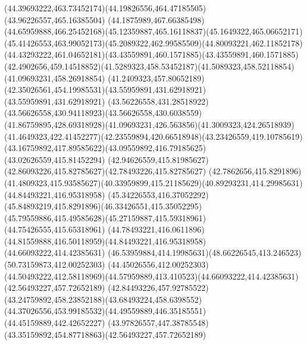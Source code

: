 {{	\curveto(44.39693222,463.73452174)(44.19826556,464.47185505)(43.96226557,465.16385504)
	\lineto(44.1875989,467.66385498)
	\curveto(44.65959888,466.25452168)(45.12359887,465.16118837)(45.1649322,465.06652171)
	\curveto(45.41426553,463.99052173)(45.2089322,462.99585509)(44.80093221,462.11852178)
	\curveto(44.43293222,461.04652181)(43.43559891,460.1571885)(43.43559891,460.1571885)
	\curveto(42.4902656,459.14518852)(41.5289323,458.53452187)(41.5089323,458.52118854)
	\lineto(41.09693231,458.26918854)
	\lineto(41.2409323,457.80652189)
	\curveto(42.35026561,454.19985531)(43.55959891,431.62918921)(43.55959891,431.62918921)
	\curveto(43.56226558,431.28518922)(43.56626558,430.94118923)(43.56626558,430.6038559)
	\curveto(41.86759895,428.69318928)(41.09693231,426.563856)(41.3009323,424.26518939)
	\curveto(41.4649323,422.41452277)(42.23559894,420.66518948)(43.23426559,419.10785619)
	\curveto(43.16759892,417.89585622)(43.09559892,416.79185625)(43.02626559,415.81452294)
	\curveto(42.94626559,415.81985627)(42.86093226,415.82785627)(42.78493226,415.82785627)
	\lineto(42.7862656,415.8291896)
	\curveto(41.4809323,415.93585627)(40.33959899,415.21185629)(40.89293231,414.29985631)
	\moveto(44.84493221,416.95318958)
	\curveto(45.34226553,416.37052292)(45.84893219,415.8291896)(46.33426551,415.35052295)
	\curveto(45.79559886,415.49585628)(45.27159887,415.59318961)(44.75426555,415.65318961)
	\curveto(44.78493221,416.0611896)(44.81559888,416.50118959)(44.84493221,416.95318958)
	\moveto(44.66093222,414.42385631)
	\curveto(46.53959884,414.19985631)(48.66226545,413.246523)(50.73159873,412.00252303)
	\lineto(44.45026556,412.00252303)
	\curveto(44.50493222,412.58118969)(44.57959889,413.410523)(44.66093222,414.42385631)
	\moveto(42.56493227,457.72652189)
	\curveto(42.84493226,457.92785522)(43.24759892,458.23852188)(43.68493224,458.6398552)
	\curveto(44.37026556,453.99185532)(44.49559889,446.35185551)(44.45159889,442.42652227)
	\curveto(43.97826557,447.38785548)(43.35159892,454.87718863)(42.56493227,457.72652189)
}
}
